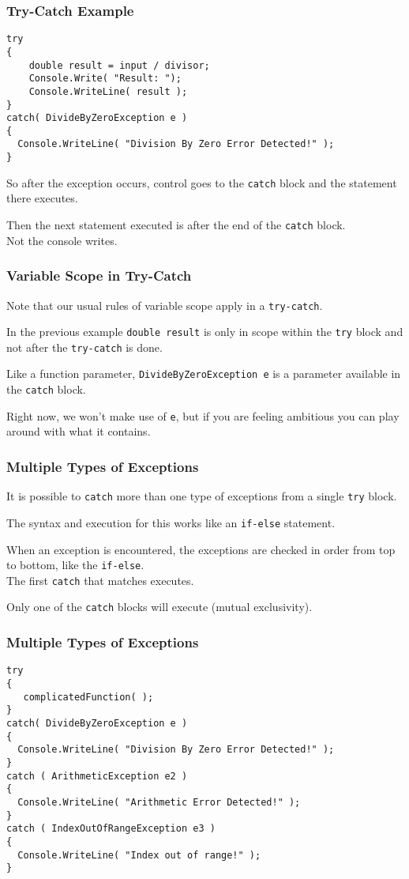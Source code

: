 \begin{frame}[fragile]
\frametitle{Try-Catch Example}
{\small
\begin{verbatim}
try
{
    double result = input / divisor;
    Console.Write( "Result: ");
    Console.WriteLine( result );
}
catch( DivideByZeroException e )
{
  Console.WriteLine( "Division By Zero Error Detected!" );
}    
\end{verbatim}
}

So after the exception occurs, control goes to the \texttt{catch} block and the statement there executes.

Then the next statement executed is after the end of the \texttt{catch} block.\\
\quad Not the console writes.
\end{frame}


\begin{frame}
\frametitle{Variable Scope in Try-Catch}

Note that our usual rules of variable scope apply in a \texttt{try-catch}.

In the previous example \texttt{double result} is only in scope within the \texttt{try} block and not after the \texttt{try-catch} is done.

Like a function parameter, \texttt{DivideByZeroException e} is a parameter available in the \texttt{catch} block.

Right now, we won't make use of \texttt{e}, but if you are feeling ambitious you can play around with what it contains.

\end{frame}

\begin{frame}
\frametitle{Multiple Types of Exceptions}

It is possible to \texttt{catch} more than one type of exceptions from a single \texttt{try} block.

The syntax and execution for this works like an \texttt{if-else} statement.

When an exception is encountered, the exceptions are checked in order from top to bottom, like the \texttt{if-else}.\\
\quad The first \texttt{catch} that matches executes.

Only one of the \texttt{catch} blocks will execute (mutual exclusivity).

\end{frame}

\begin{frame}[fragile]
\frametitle{Multiple Types of Exceptions}


\begin{verbatim}
try
{
   complicatedFunction( );
}
catch( DivideByZeroException e )
{
  Console.WriteLine( "Division By Zero Error Detected!" );
}
catch ( ArithmeticException e2 )
{
  Console.WriteLine( "Arithmetic Error Detected!" );
}
catch ( IndexOutOfRangeException e3 )
{
  Console.WriteLine( "Index out of range!" );
}
\end{verbatim}


\end{frame}

